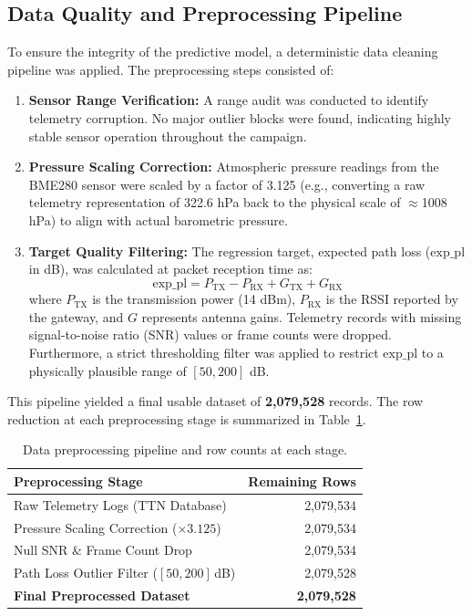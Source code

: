 \subsection{Data Quality and Preprocessing Pipeline}
To ensure the integrity of the predictive model, a deterministic data cleaning pipeline was applied. The preprocessing steps consisted of:
\begin{enumerate}
    \item \textbf{Sensor Range Verification:} A range audit was conducted to identify telemetry corruption. No major outlier blocks were found, indicating highly stable sensor operation throughout the campaign.
    \item \textbf{Pressure Scaling Correction:} Atmospheric pressure readings from the BME280 sensor were scaled by a factor of 3.125 (e.g., converting a raw telemetry representation of 322.6 hPa back to the physical scale of $\approx$1008 hPa) to align with actual barometric pressure.
    \item \textbf{Target Quality Filtering:} The regression target, expected path loss ($\text{exp\_pl}$ in dB), was calculated at packet reception time as:
    \begin{equation}
        \text{exp\_pl} = P_{\text{TX}} - P_{\text{RX}} + G_{\text{TX}} + G_{\text{RX}}
    \end{equation}
    where $P_{\text{TX}}$ is the transmission power (14 dBm), $P_{\text{RX}}$ is the RSSI reported by the gateway, and $G$ represents antenna gains. Telemetry records with missing signal-to-noise ratio (SNR) values or frame counts were dropped. Furthermore, a strict thresholding filter was applied to restrict $\text{exp\_pl}$ to a physically plausible range of $[50, 200]$ dB.
\end{enumerate}
This pipeline yielded a final usable dataset of \textbf{2,079,528} records. The row reduction at each preprocessing stage is summarized in Table~\ref{tab:data-cleaning}.

\begin{table}[H]
  \centering
  \begin{tabular}{lr}
    \toprule
    \textbf{Preprocessing Stage} & \textbf{Remaining Rows} \\
    \midrule
    Raw Telemetry Logs (TTN Database)           & 2,079,534 \\
    Pressure Scaling Correction ($\times 3.125$) & 2,079,534 \\
    Null SNR \& Frame Count Drop                & 2,079,534 \\
    Path Loss Outlier Filter ($[50, 200]$\,dB)   & 2,079,528 \\
    \textbf{Final Preprocessed Dataset}        & \textbf{2,079,528} \\
    \bottomrule
  \end{tabular}
  \caption{Data preprocessing pipeline and row counts at each stage.}
  \label{tab:data-cleaning}
\end{table}

